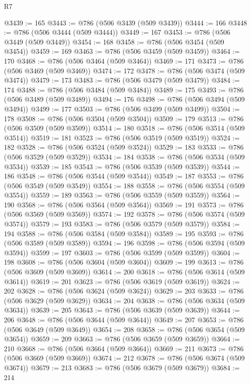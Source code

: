 \begin{lexlean}{R7}
\begin{coremodule}
@3439 := 165
@3443 := @786 (@506 @3439 (@509 @3439))
@3444 := 166
@3448 := @786 (@506 @3444 (@509 @3444))
@3449 := 167
@3453 := @786 (@506 @3449 (@509 @3449))
@3454 := 168
@3458 := @786 (@506 @3454 (@509 @3454))
@3459 := 169
@3463 := @786 (@506 @3459 (@509 @3459))
@3464 := 170
@3468 := @786 (@506 @3464 (@509 @3464))
@3469 := 171
@3473 := @786 (@506 @3469 (@509 @3469))
@3474 := 172
@3478 := @786 (@506 @3474 (@509 @3474))
@3479 := 173
@3483 := @786 (@506 @3479 (@509 @3479))
@3484 := 174
@3488 := @786 (@506 @3484 (@509 @3484))
@3489 := 175
@3493 := @786 (@506 @3489 (@509 @3489))
@3494 := 176
@3498 := @786 (@506 @3494 (@509 @3494))
@3499 := 177
@3503 := @786 (@506 @3499 (@509 @3499))
@3504 := 178
@3508 := @786 (@506 @3504 (@509 @3504))
@3509 := 179
@3513 := @786 (@506 @3509 (@509 @3509))
@3514 := 180
@3518 := @786 (@506 @3514 (@509 @3514))
@3519 := 181
@3523 := @786 (@506 @3519 (@509 @3519))
@3524 := 182
@3528 := @786 (@506 @3524 (@509 @3524))
@3529 := 183
@3533 := @786 (@506 @3529 (@509 @3529))
@3534 := 184
@3538 := @786 (@506 @3534 (@509 @3534))
@3539 := 185
@3543 := @786 (@506 @3539 (@509 @3539))
@3544 := 186
@3548 := @786 (@506 @3544 (@509 @3544))
@3549 := 187
@3553 := @786 (@506 @3549 (@509 @3549))
@3554 := 188
@3558 := @786 (@506 @3554 (@509 @3554))
@3559 := 189
@3563 := @786 (@506 @3559 (@509 @3559))
@3564 := 190
@3568 := @786 (@506 @3564 (@509 @3564))
@3569 := 191
@3573 := @786 (@506 @3569 (@509 @3569))
@3574 := 192
@3578 := @786 (@506 @3574 (@509 @3574))
@3579 := 193
@3583 := @786 (@506 @3579 (@509 @3579))
@3584 := 194
@3588 := @786 (@506 @3584 (@509 @3584))
@3589 := 195
@3593 := @786 (@506 @3589 (@509 @3589))
@3594 := 196
@3598 := @786 (@506 @3594 (@509 @3594))
@3599 := 197
@3603 := @786 (@506 @3599 (@509 @3599))
@3604 := 198
@3608 := @786 (@506 @3604 (@509 @3604))
@3609 := 199
@3613 := @786 (@506 @3609 (@509 @3609))
@3614 := 200
@3618 := @786 (@506 @3614 (@509 @3614))
@3619 := 201
@3623 := @786 (@506 @3619 (@509 @3619))
@3624 := 202
@3628 := @786 (@506 @3624 (@509 @3624))
@3629 := 203
@3633 := @786 (@506 @3629 (@509 @3629))
@3634 := 204
@3638 := @786 (@506 @3634 (@509 @3634))
@3639 := 205
@3643 := @786 (@506 @3639 (@509 @3639))
@3644 := 206
@3648 := @786 (@506 @3644 (@509 @3644))
@3649 := 207
@3653 := @786 (@506 @3649 (@509 @3649))
@3654 := 208
@3658 := @786 (@506 @3654 (@509 @3654))
@3659 := 209
@3663 := @786 (@506 @3659 (@509 @3659))
@3664 := 210
@3668 := @786 (@506 @3664 (@509 @3664))
@3669 := 211
@3673 := @786 (@506 @3669 (@509 @3669))
@3674 := 212
@3678 := @786 (@506 @3674 (@509 @3674))
@3679 := 213
@3683 := @786 (@506 @3679 (@509 @3679))
@3684 := 214

\end{coremodule}
\end{lexlean}

